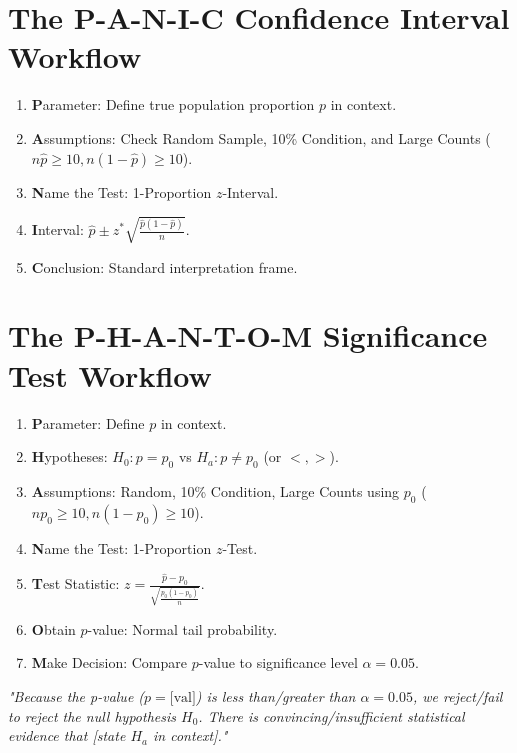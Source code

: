 ﻿\documentclass[11pt,oneside,openany]{book}
\begin{document}
\section{The P-A-N-I-C Confidence Interval Workflow}
\begin{enumerate}[leftmargin=1.5em]
  \item \textbf{P}arameter: Define true population proportion $p$ in context.
  \item \textbf{A}ssumptions: Check Random Sample, 10\% Condition, and Large Counts ($n\hat{p} \ge 10, n(1-\hat{p}) \ge 10$).
  \item \textbf{N}ame the Test: 1-Proportion $z$-Interval.
  \item \textbf{I}nterval: $\hat{p} \pm z^* \sqrt{\frac{\hat{p}(1-\hat{p})}{n}}$.
  \item \textbf{C}onclusion: Standard interpretation frame.
\end{enumerate}

\section{The P-H-A-N-T-O-M Significance Test Workflow}
\begin{enumerate}[leftmargin=1.5em]
  \item \textbf{P}arameter: Define $p$ in context.
  \item \textbf{H}ypotheses: $H_0: p = p_0$ vs $H_a: p \ne p_0$ (or $<, >$).
  \item \textbf{A}ssumptions: Random, 10\% Condition, Large Counts using $p_0$ ($np_0 \ge 10, n(1-p_0) \ge 10$).
  \item \textbf{N}ame the Test: 1-Proportion $z$-Test.
  \item \textbf{T}est Statistic: $z = \frac{\hat{p} - p_0}{\sqrt{\frac{p_0(1-p_0)}{n}}}$.
  \item \textbf{O}btain $p$-value: Normal tail probability.
  \item \textbf{M}ake Decision: Compare $p$-value to significance level $\alpha = 0.05$.
\end{enumerate}

\begin{frqrubricbox}
\textit{"Because the p-value ($p = \text{[val]}$) is less than/greater than $\alpha = 0.05$, we reject/fail to reject the null hypothesis $H_0$. There is convincing/insufficient statistical evidence that [state $H_a$ in context]."}
\end{frqrubricbox}
\end{document}
